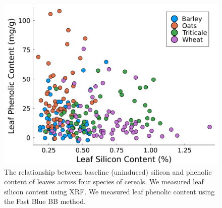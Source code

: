 \documentclass[12pt, letterpaper]{report}
\begin{document}
\begin{figure}[ht]
        \includegraphics[width = \textwidth]{images/phenolic_silicon_regression.png}
        \centering
        \caption{The relationship between baseline (uninduced) silicon and phenolic content of leaves across four species of cereals. We measured leaf silicon content using XRF. We measured leaf phenolic content using the Fast Blue BB method.}
        \label{Fig:phe_si_scatter}
\end{figure}
\clearpage
\end{document}
